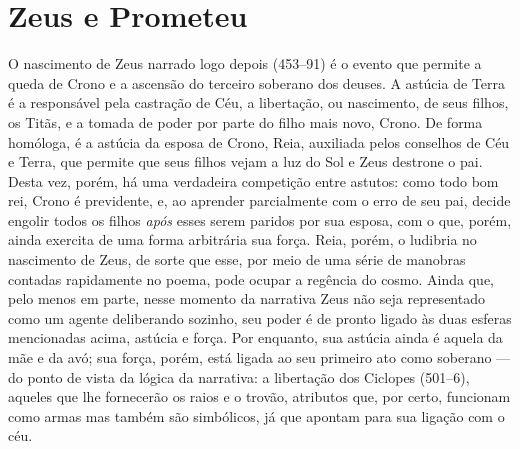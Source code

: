 
\section{Zeus e Prometeu}

O nascimento de Zeus narrado logo depois (453--91) é o evento que permite
a queda de Crono e a ascensão do terceiro soberano dos deuses. A astúcia
de Terra é a responsável pela castração de Céu, a libertação, ou
nascimento, de seus filhos, os Titãs, e a tomada de
poder por parte do filho mais novo, Crono. De forma homóloga, é a
astúcia da esposa de Crono, Reia, auxiliada pelos conselhos de Céu e
Terra, que permite que seus filhos vejam a luz do Sol e Zeus destrone o
pai. Desta vez, porém, há uma verdadeira competição entre astutos: como
todo bom rei, Crono é previdente, e, ao aprender parcialmente com o
erro de seu pai, decide engolir todos os filhos \textit{após} esses serem
paridos por sua esposa, com o que, porém, ainda exercita de uma forma
arbitrária sua força. Reia, porém, o ludibria no nascimento de Zeus, de
sorte que esse, por meio de uma série de manobras contadas rapidamente
no poema, pode ocupar a regência do cosmo. Ainda que, pelo menos em
parte, nesse momento da narrativa Zeus não seja representado como um
agente deliberando sozinho, seu poder é de pronto ligado às duas esferas
mencionadas acima, astúcia e força. Por enquanto, sua astúcia ainda é
aquela da mãe e da avó; sua força, porém, está ligada ao seu primeiro
ato como soberano --- do ponto de vista da lógica da narrativa: a
libertação dos Ciclopes (501--6), aqueles que lhe fornecerão os raios e o
trovão, atributos que, por certo, funcionam como armas mas também são
simbólicos, já que apontam para sua ligação com o céu.


